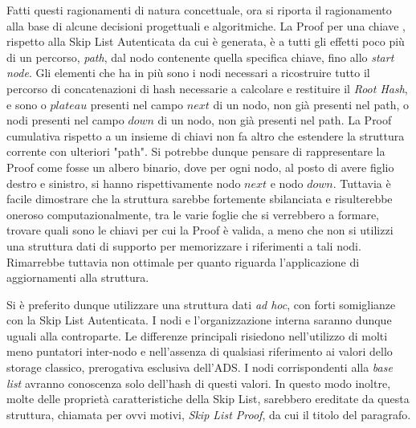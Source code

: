 		Fatti questi ragionamenti di natura concettuale, ora si riporta il ragionamento alla base di alcune decisioni progettuali e algoritmiche. La Proof per una chiave , rispetto alla Skip List Autenticata da cui è generata, è a tutti gli effetti poco più di un percorso, \textit{path}, dal nodo contenente quella specifica chiave, fino allo \textit{start node}. Gli elementi che ha in più sono i nodi necessari a ricostruire tutto il percorso di concatenazioni di hash necessarie a calcolare e restituire il \textit{Root Hash}, e sono o $ plateau $ presenti nel campo $ next $ di un nodo, non già presenti nel path, o nodi presenti nel campo $ down $ di un nodo, non già presenti nel path. La Proof cumulativa rispetto a un insieme di chiavi non fa altro che estendere la struttura corrente con ulteriori "path".
		Si potrebbe dunque pensare di rappresentare la Proof come fosse un albero binario, dove per ogni nodo, al posto di avere figlio destro e sinistro, si hanno rispettivamente nodo $ next $ e nodo $ down $. Tuttavia è facile dimostrare che la struttura sarebbe fortemente sbilanciata e risulterebbe oneroso computazionalmente, tra le varie foglie che si verrebbero a formare, trovare quali sono le chiavi per cui la Proof è valida, a meno che non si utilizzi una struttura dati di supporto per memorizzare i riferimenti a tali nodi. Rimarrebbe tuttavia non ottimale per quanto riguarda l'applicazione di aggiornamenti alla struttura.
 				
		Si è preferito dunque utilizzare una struttura dati \textit{ad hoc}, con forti somiglianze con la Skip List Autenticata. I nodi e l'organizzazione interna saranno dunque uguali alla controparte. Le differenze principali risiedono nell'utilizzo di molti meno puntatori inter-nodo e nell'assenza di qualsiasi riferimento ai valori dello storage classico, prerogativa esclusiva dell'ADS. I nodi corrispondenti alla \textit{base list} avranno conoscenza solo dell'hash di questi valori.
		In questo modo inoltre, molte delle proprietà caratteristiche della Skip List, sarebbero ereditate da questa struttura, chiamata per ovvi motivi, \textit{Skip List Proof}, da cui il titolo del paragrafo.
		
